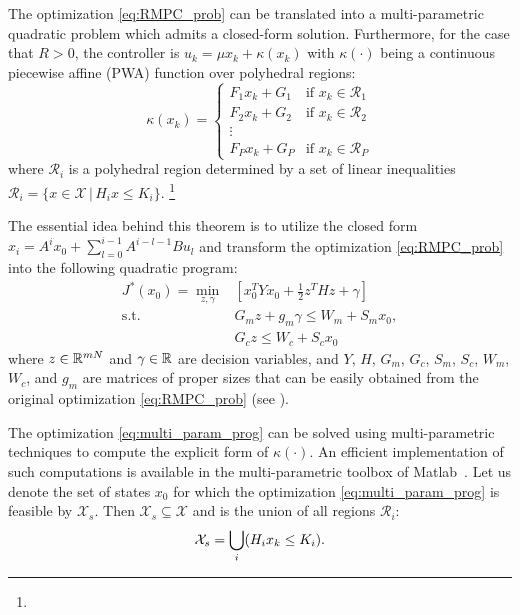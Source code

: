 \begin{theorem}
\label{thm:EMPC}
The optimization \eqref{eq:RMPC_prob} can be translated into a multi-parametric quadratic problem which admits a closed-form solution. Furthermore, for the case that $R>0$, the controller is $u_k = \mu x_k + \kappa(x_k)$ with $\kappa(\cdot)$ being a continuous piecewise affine (PWA) function over polyhedral regions:
\begin{equation}
\label{eq:affine_map}
\kappa(x_k)=
\begin{cases}
F_1x_k+G_1 & \text{if $x_k\in \mathcal{R}_1$}\\
F_2x_k+G_2 & \text{if $x_k\in \mathcal{R}_2$}\\
\vdots\\
F_Px_k+G_P & \text{if $x_k\in \mathcal{R}_P$}
\end{cases} 
\end{equation}
where $\mathcal{R}_i$ is a polyhedral region determined by a set of linear inequalities $\mathcal R_i = \{x\in\mathcal X\,|\,H_ix\leq K_i\}$. \footnote{}
\end{theorem}
The essential idea behind this theorem is to utilize the closed form $x_i=A^ix_0+\sum_{l=0}^{i-1}A^{i-l-1}Bu_l$ and transform the optimization \eqref{eq:RMPC_prob} into the following quadratic program:
\begin{align}
\label{eq:multi_param_prog}
J^{\ast}(x_0)=\min_{z,\gamma}& \left[x_0^TYx_0+\frac{1}{2}z^THz+\gamma\right]\\
\text{s.t.} \quad &G_mz+g_m\gamma\leq W_m+S_mx_0,\nonumber\\
&G_cz\leq W_c+S_cx_0\nonumber
\end{align}
where $z\in \mathbb{R}^{mN}$ and $\gamma\in\mathbb{R}$ are decision variables, and $Y$, $H$, $G_m$, $G_c$, $S_m$, $S_c$, $W_m$, $W_c$, and $g_m$ 
are matrices of proper sizes that can be easily obtained from the original optimization \eqref{eq:RMPC_prob}  (see \cite{delaPea:2005}).


The optimization \eqref{eq:multi_param_prog} can be solved using multi-parametric techniques to compute the explicit form of $\kappa(\cdot)$.
An efficient implementation of such computations is available in the multi-parametric toolbox of Matlab~\cite{matlabMPT, matlabYALMIP}.
Let us denote the set of states $x_0$ for which the optimization  \eqref{eq:multi_param_prog} is feasible by $\mathcal X_s$. Then $\mathcal X_s\subseteq \mathcal X$ and is the union of all regions $\mathcal{R}_{i}$:
\begin{equation}
\mathcal X_s = \bigcup_{i}(H_{i}x_{k}\leq K_{i}).
\end{equation}


